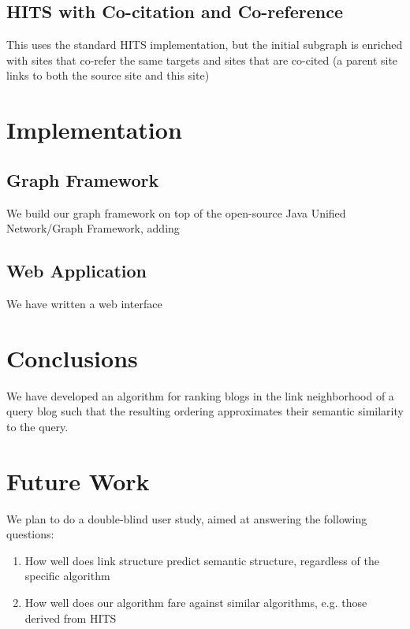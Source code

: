 \documentclass{sig-alternate}
\begin{document}
\subsection{HITS with Co-citation and Co-reference}

This uses the standard HITS implementation, but the initial subgraph
is enriched with sites that co-refer the same targets and sites that
are co-cited (a parent site links to both the source site and this
site)

\section{Implementation}
\subsection{Graph Framework}

We build our graph framework on top of the open-source Java Unified
Network/Graph Framework, adding


\subsection{Web Application}
We have written a web interface 

\section{Conclusions}

We have developed an algorithm for ranking blogs in the link
neighborhood of a query blog such that the resulting ordering
approximates their semantic similarity to the query.

\section{Future Work}
We plan to do a double-blind user study, aimed at answering the
following questions:
\begin{enumerate}
\item How well does link structure predict semantic structure,
  regardless of the specific algorithm
\item How well does our algorithm fare against similar algorithms,
  e.g. those derived from HITS

\end{enumerate}
\end{document}
